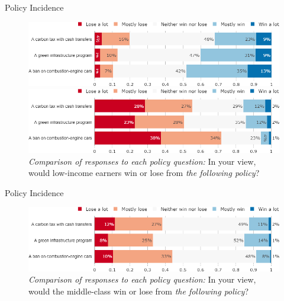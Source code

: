 \documentclass[aspectratio=169,9pt,dvipsnames]{beamer}
\begin{document}
\begin{frame}{Policy Incidence}%
\begin{figure}[h!]
\centering
\caption{\textit{Comparison of responses to each policy question:} In your view, would high-income earners win or lose from \textit{the following policy}?}
\includegraphics[width=.7\textwidth]{../figures/DK/policies_win_lose_rich_DK.png}
\vspace{-.1cm}
\centering
\caption{\textit{Comparison of responses to each policy question:} In your view, would low-income earners win or lose from \textit{the following policy}?}
\includegraphics[width=.7\textwidth]{../figures/DK/policies_win_lose_poor_DK.png}
\end{figure}
\end{frame}

\begin{frame}{Policy Incidence}%
\begin{figure}[h!]
\centering
\caption{\textit{Comparison of responses to each policy question:} In your view, would the middle-class win or lose from \textit{the following policy}?}
\includegraphics[width=.7\textwidth]{../figures/DK/policies_win_lose_middle_DK.png}
\end{figure}
\end{frame}
\end{document}
